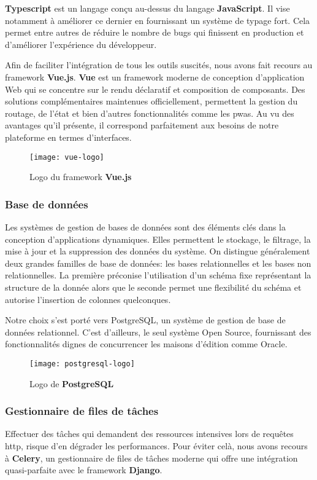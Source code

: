 \textbf{Typescript} est un langage conçu au-dessus du langage \textbf{JavaScript}. 
Il vise notamment à améliorer ce dernier en fournissant un système de typage fort. 
Cela permet entre autres de réduire le nombre de bugs qui finissent en production et d'améliorer l'expérience du développeur.

Afin de faciliter l'intégration de tous les outils suscités, nous avons fait recours au framework \textbf{Vue.js}. 
\textbf{Vue} est un framework moderne de conception d’application Web qui se concentre sur le rendu déclaratif et composition de composants. 
Des solutions complémentaires maintenues officiellement, permettent la gestion du routage, de l'état et bien d’autres fonctionnalités comme les \acrshort{pwa}s. 
Au vu des avantages qu’il présente, il correspond parfaitement aux besoins de notre plateforme en termes d’interfaces.

\begin{figure}[h]
  \centering
  \texttt{[image: vue-logo]}
  \caption{Logo du framework \textbf{Vue.js}}
  \label{fig:vue_logo}
\end{figure}


\subsubsection{Base de données}
Les systèmes de gestion de bases de données sont des éléments clés dans la conception d’applications dynamiques. 
Elles permettent le stockage, le filtrage, la mise à jour et la suppression des données du système. 
On distingue généralement deux grandes familles de base de données: les bases relationnelles et les bases non relationnelles. 
La première préconise l’utilisation d’un schéma fixe représentant la structure de la donnée alors que le seconde permet une flexibilité du schéma et autorise l’insertion de colonnes quelconques.

Notre choix s’est porté vers PostgreSQL, un système de gestion de base de données relationnel. 
C’est d’ailleurs, le seul système Open Source, fournissant des fonctionnalités dignes de concurrencer les maisons d'édition comme Oracle.

\begin{figure}[H]
  \centering
  \texttt{[image: postgresql-logo]}
  \caption{Logo de \textbf{PostgreSQL}}
  \label{fig:pg_logo}
\end{figure}

\subsubsection{Gestionnaire de files de tâches}
Effectuer des tâches qui demandent des ressources intensives lors de requêtes \acrshort{http}, risque d’en dégrader les performances. 
Pour éviter celà, nous avons recours à \textbf{Celery}, un gestionnaire de files de tâches moderne qui offre une intégration quasi-parfaite avec le framework \textbf{Django}.


